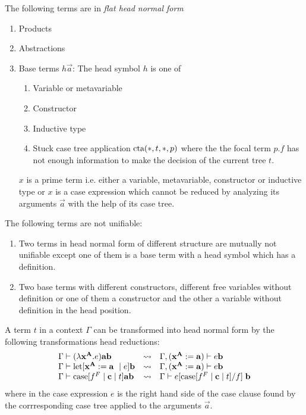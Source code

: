 The following terms are in \emph{flat head normal form}
\begin{enumerate}
    \item Products

    \item Abstractions

    \item Base terms $h \vec a$: The head symbol $h$ is one of
        \begin{enumerate}
            \item Variable or metavariable
            \item Constructor
            \item Inductive type
            \item Stuck case tree application ${\text{cta}}(*, t, *, p)$
                where the the focal term $p.f$ has not enough information to
                make the decision of the current tree $t$.
        \end{enumerate}


        $x$ is a prime term i.e. either a variable,
        metavariable, constructor or inductive type or $x$ is a case expression
        which cannot be reduced by analyzing its arguments $\vec a$ with the help
        of its case tree.
\end{enumerate}

The following terms are not unifiable:
\begin{enumerate}
    \item Two terms in head normal form of different structure are mutually not
        unifiable except one of them is a base term with a head symbol which has
        a definition.

    \item Two base terms with different constructors, different free variables
        without definition or one of them a constructor and the other a variable
        without definition in the head position.
\end{enumerate}

A term $t$ in a context $\Gamma$ can be transformed into head normal form by the
following transformations head reductions:
$$
\begin{array}{lll}
    \Gamma \vdash (\lambda \vec x^{\vec A}. e) \vec a \vec b
    &\leadsto&
    \Gamma, (\vec x^{\vec A} := \vec a) \vdash e \vec b
    \\
    \Gamma \vdash \llet[\vec x^{\vec A} := \vec a \mid e] \vec b
    &\leadsto&
    \Gamma, (\vec x^{\vec A} := \vec a) \vdash e \vec b
    \\
    \Gamma \vdash \case[f^F \mid \vec c \mid t] \vec a \vec b
    &\leadsto&
    \Gamma \vdash e[\case [f^F \mid \vec c \mid t] / f] \; \vec b
\end{array}
$$
where in the case expression $e$ is the right hand side of the case clause found
by the corrresponding case tree applied to the arguments $\vec a$.

